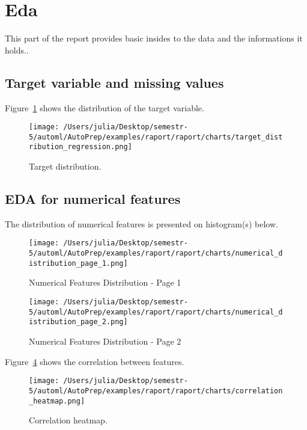 \documentclass{article}%
\begin{document}
%
\section{Eda}%
\label{sec:Eda}%

%
This part of the report provides basic insides to the data and the informations it holds..%
\subsection{Target variable and missing values}%
\label{subsec:Targetvariableandmissingvalues}%

%
Figure~\ref{Target distribution.} %
 shows the distribution of the target variable.%


\begin{figure}[H]%
\centering%
\texttt{[image: /Users/julia/Desktop/semestr-5/automl/AutoPrep/examples/raport/raport/charts/target\_distribution\_regression.png]}%
\caption{Target distribution.}%
\label{Target distribution.}%
\end{figure}

%
\subsection{EDA for numerical features}%
\label{subsec:EDAfornumericalfeatures}%

%
The distribution of numerical features is presented on histogram(s) below.%


\begin{figure}[H]%
\centering%
\texttt{[image: /Users/julia/Desktop/semestr-5/automl/AutoPrep/examples/raport/raport/charts/numerical\_distribution\_page\_1.png]}%
\caption{Numerical Features Distribution {-} Page 1}%
\label{Numerical Features Distribution - Page 1}%
\end{figure}

%


\begin{figure}[H]%
\centering%
\texttt{[image: /Users/julia/Desktop/semestr-5/automl/AutoPrep/examples/raport/raport/charts/numerical\_distribution\_page\_2.png]}%
\caption{Numerical Features Distribution {-} Page 2}%
\label{Numerical Features Distribution - Page 2}%
\end{figure}

%
Figure~\ref{Correlation heatmap.} %
 shows the correlation between features.%


\begin{figure}[H]%
\centering%
\texttt{[image: /Users/julia/Desktop/semestr-5/automl/AutoPrep/examples/raport/raport/charts/correlation\_heatmap.png]}%
\caption{Correlation heatmap.}%
\label{Correlation heatmap.}%
\end{figure}
\end{document}
